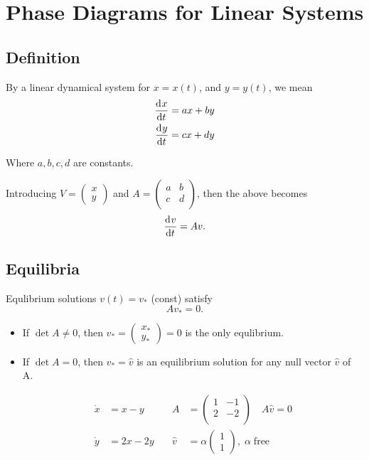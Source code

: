 \documentclass[12pt,twoside]{article}
\begin{document}
\section{Phase Diagrams for Linear Systems}
\subsection{Definition}
By a linear dynamical system for $x=x(t)$, and $y=y(t)$, we mean
\begin{equation}
  \begin{aligned}
    \frac{\mathrm{d}^{} {x}}{\mathrm{d}{t}^{}} &= ax+by \\
    \frac{\mathrm{d}^{} {y}}{\mathrm{d}{t}^{}} &= cx+dy \\
  \end{aligned}
\end{equation}

Where $a,b,c,d$ are constants.

Introducing $V= \begin{pmatrix} x \\ y \end{pmatrix}$ and $A = \begin{pmatrix} a
  & b \\ c & d \\ \end{pmatrix}$, then the above becomes $$\frac{\mathrm{d}^{} {v}}{\mathrm{d}{t}^{}}=Av.$$

\subsection{Equilibria}
Equlibrium solutions $v(t)=v_*$ (const) satisfy $$Av_*=0.$$

\begin{itemize}
\item If $\det A\ne0$, then $v_*=\begin{pmatrix} x_* \\
      y_* \end{pmatrix}=0$ is the only equlibrium.
\item If $\det A=0$, then $v_*=\hat{v}$ is an equilibrium solution for any null
  vector $\hat{v}$ of A.

  \begin{equation}
    \begin{aligned}
      \dot{x}&=x-y \quad& A&=
      \begin{pmatrix}
        1 & -1 \\ 2 & -2 \\
      \end{pmatrix}
      \quad A\hat{v} = 0 \\
      \dot{y} &= 2x-2y \quad& \hat{v} &= \alpha
      \begin{pmatrix}
        1 \\ 1
      \end{pmatrix},\; \alpha\;\text{free}
    \end{aligned}
  \end{equation}
\end{itemize}
\end{document}
